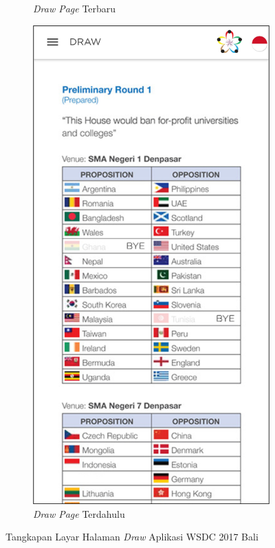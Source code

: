\begin{figure}[H]
\begin{subfigure}[b]{0.3\textwidth}
         \caption{\textit{Draw Page} Terbaru}
         \label{fig:ssDraw}
     \end{subfigure}
     \hspace*{0.5in}
     \begin{subfigure}[b]{0.3\textwidth}
         \centering
         \includegraphics[width=\textwidth]{Gambar/DrawPage.png}
         \caption{\textit{Draw Page} Terdahulu}
         \label{fig:ssDrawOld}
     \end{subfigure}
        \caption{Tangkapan Layar Halaman \textit{Draw} Aplikasi WSDC 2017 Bali}
        \label{fig:ssApk1}
\end{figure}


